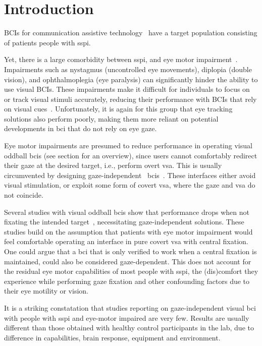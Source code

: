 \section{Introduction}

BCIs for communication assistive technology~\cite{Millan2010}
have a target population consisting of patients people with \ac{sspi}.

Yet, there is a large comorbidity between \ac{sspi}, and eye motor impairment~\cite{FriedOken2020}.
Impairments such as nystagmus (uncontrolled eye movements), diplopia (double
vision), and ophthalmoplegia (eye paralysis) can significantly hinder
the ability to use visual BCIs. These impairments make it difficult for
individuals to focus on or track visual stimuli accurately, reducing their
performance with BCIs that rely on visual cues~\cite{McCane2014,FriedOken2020,Pasqualotto2015}.
Unfortunately, it is again for this group that eye tracking solutions also
perform poorly, making them more reliant on potential developments in \ac{bci}
that do not rely on eye gaze.

Eye motor impairments are presumed to reduce performance in operating visual
oddball \ac{bci}s (see section for an overview), since users
cannot comfortably redirect their gaze at the desired target,
i.e., perform overt \ac{vsa}.
This is usually circumvented by designing gaze-independent~
\acp{bci}~\cite{Riccio2012}.
These interfaces either avoid visual stimulation, or exploit some form of
covert \ac{vsa}, where the gaze and \ac{vsa} do not coincide.

Several studies with visual oddball \acp{bci} show that performance drops when not fixating the intended
target~\cite{Brunner2010, Treder2010, RonAngevin2019}, necessitating
gaze-independent solutions.
These studies build on the assumption that patients with eye motor impairment
would feel comfortable operating an interface in pure covert \ac{vsa} with
central fixation.
One could argue that a \ac{bci} that is only verified to work when a central
fixation is maintained, could also be considered gaze-dependent.
This does not account for the residual eye motor capabilities of most people
with \ac{sspi}, the (dis)comfort they experience while
performing gaze fixation and other confounding factors due to their eye
motility or vision.

It is a striking constatation that studies reporting on
gaze-independent visual \ac{bci} with people with \ac{sspi} and eye-motor
impaired are very few.
Results are usually different than those obtained with healthy control
participants in the lab, due to difference in capabilities, brain
response, equipment and environment.


